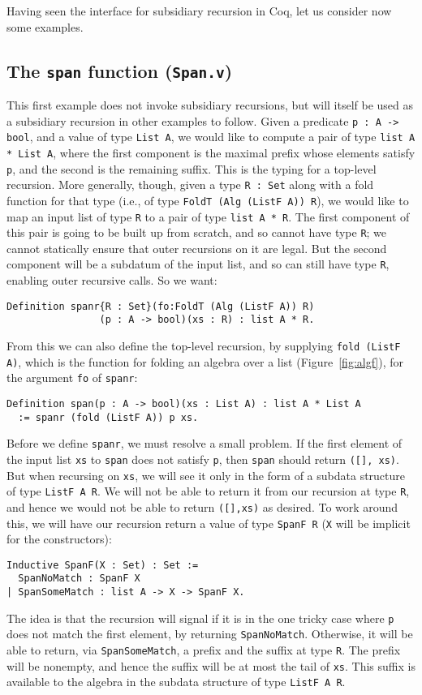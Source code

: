 \documentclass[a4paper,USenglish]{lipics-v2021}
\begin{document}
Having seen the interface for subsidiary recursion in Coq, let us
consider now some examples.  

\subsection{The \texttt{span} function (\texttt{Span.v})}

This first example does not invoke subsidiary recursions, but will
itself be used as a subsidiary recursion in other examples to follow.
Given a predicate \verb|p : A -> bool|, and a value of type
\verb|List A|, we would like to compute a pair of type
\verb|list A * List A|, where the first component is the maximal
prefix whose elements satisfy \verb|p|, and the second is the
remaining suffix.  This is the typing for a top-level recursion.  More
generally, though, given a type \verb|R : Set| along with a
fold function for that type (i.e., of type
\verb|FoldT (Alg (ListF A)) R|), we would like to map an input list of
type \verb|R| to a pair of type \verb|list A * R|.  The first
component of this pair is going to be built up from scratch, and so
cannot have type \verb|R|; we cannot statically ensure that outer
recursions on it are legal.  But the second component will be a
subdatum of the input list, and so can still have type \verb|R|,
enabling outer recursive calls.  So we want:
\begin{verbatim}
Definition spanr{R : Set}(fo:FoldT (Alg (ListF A)) R)
                (p : A -> bool)(xs : R) : list A * R.
\end{verbatim}
\noindent From this we can also define the top-level recursion, by
supplying \verb|fold (ListF A)|, which is the function for folding an algebra
over a list (Figure~\ref{fig:algf}), for the argument \verb|fo| of \verb|spanr|:
\begin{verbatim}
Definition span(p : A -> bool)(xs : List A) : list A * List A
  := spanr (fold (ListF A)) p xs.
\end{verbatim}

Before we define \verb|spanr|, we must resolve a small problem.
If the first element of the input list
\verb|xs| to \verb|span| does not satisfy \verb|p|, then \verb|span|
should return \verb|([], xs)|.  But when recursing on \verb|xs|, we
will see it only in the form of a subdata structure of type
\verb|ListF A R|.  We will not be able to return it from our recursion at
type \verb|R|, and hence we would not be able to return \verb|([],xs)|
as desired.  To work around this, we will have our recursion return a value
of type \verb|SpanF R| (\verb|X| will be implicit for the constructors):
\begin{verbatim}
Inductive SpanF(X : Set) : Set :=
  SpanNoMatch : SpanF X
| SpanSomeMatch : list A -> X -> SpanF X.
\end{verbatim}
\noindent The idea is that the recursion will signal if it is in the
one tricky case where \verb|p| does not match the first element, by
returning \verb|SpanNoMatch|.  Otherwise, it will be able to return,
via \verb|SpanSomeMatch|, a prefix and the suffix at type
\verb|R|. The prefix will be nonempty, and hence the suffix will be at
most the tail of \verb|xs|.  This suffix is available to the algebra
in the subdata structure of type \verb|ListF A R|.
\end{document}
